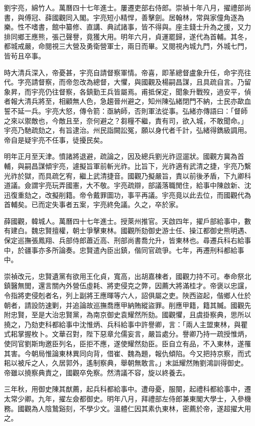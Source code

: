 \begin{pinyinscope}
劉宇亮，綿竹人。萬曆四十七年進士。屢遷吏部右侍郎。崇禎十年八月，擢禮部尚書，與傅冠、薛國觀同入閣。宇亮短小精悍，善擊劍。居翰林，常與家僮角逐為樂。性不嗜書，館中纂修、直講、典試諸事，皆不得與。座主錢士升為之援，又力排同鄉王應熊，張己聲譽，竟獲大用。明年六月，貞運罷歸，遂代為首輔。其冬，都城戒嚴，命閱視三大營及勇衛營軍士，兩日而畢。又閱視內城九門，外城七門，皆茍且卒事。

時大清兵深入，帝憂甚，宇亮自請督察軍情。帝喜，即革總督盧象升任，命宇亮往代。字亮請督察，而帝忽改為總督，大懼，與國觀及楊嗣昌謀，且具疏自言。乃留象昇，而宇亮仍往督察，各鎮勤王兵皆屬焉。甫抵保定，聞象升戰歿，過安平，偵者報大清兵將至，相顧無人色，急趨晉州避之，知州陳弘緒閉門不納，士民亦歃血誓不延一兵。宇亮大怒，傳令箭：亟納師，否則軍法從事。弘緒亦傳語曰：「督師之來以禦敵也，今敵且至，奈何避之？芻糧不繼，責有司，欲入城，不敢聞命。」宇亮乃馳疏劾之，有旨逮治。州民詣闕訟冤，願以身代者千計，弘緒得鐫級調用。帝自是疑宇亮不任事，徒擾民矣。

明年正月至天津。憤諸將退避，疏論之，因及總兵劉光祚逗遛狀。國觀方冀為首輔，與嗣昌謀傾宇亮，遽擬旨軍前斬光祚。比旨下，光祚適有武清之捷，宇亮乃繫光祚於獄，而具疏乞宥，繼上武清捷音。國觀乃擬嚴旨，責以前後矛盾，下九卿科道議。僉謂宇亮玩弄國憲，大不敬。宇亮疏辯，部議落職閒住，給事中陳啟新、沈迅復重劾之，改擬削籍。帝令戴罪圖功，事平再議。宇亮竟以此去位，而國觀代為首輔矣。已而定失事者五案，宇亮終免議。久之，卒於家。

薛國觀，韓城人。萬曆四十七年進士。授萊州推官。天啟四年，擢戶部給事中，數有建白。魏忠賢擅權，朝士爭擊東林。國觀所劾御史游士任、操江都御史熊明遇、保定巡撫張鳳翔、兵部侍郎蕭近高、刑部尚書喬允升，皆東林也。尋遷兵科右給事中，於疆事亦多所論奏。忠賢遣內臣出鎮，偕同官疏爭。七年，再遷刑科都給事中。

崇禎改元，忠賢遺黨有欲用王化貞，寬高，出胡嘉棟者，國觀力持不可。奉命祭北鎮醫無閭，還言關內外營伍虛耗、將吏侵克之弊，因薦大將滿桂才。帝褒以忠讜，令指將吏侵剋者名，列上副將王應暉等六人，詔俱屬之吏。陜西盜起，偕鄉人仕於朝者，請設防速剿，并追論故巡撫喬應甲納賄縱盜罪。削應甲籍，籍其贓。國觀先附忠賢，至是大治忠賢黨，為南京御史袁耀然所劾。國觀懼，且虞掛察典，思所以撓之，乃劾吏科都給事中沈惟炳、兵科給事中許譽卿，言：「兩人主盟東林，與瞿式耜掌握枚卜。文華召對，陛下惡章允儒妄言，嚴旨處分。譽卿乃持一疏授惟炳，使同官劉斯珣邀臣列名，臣拒不應，遂使耀然劾臣。臣自立有品，不入東林，遂罹其害。今朝局惟論東林異同向背，借崔、魏為題，報仇傾陷。今又把持京察，而式耜以被斥之人，久居郭外，遙制察典，舉朝無敢言。」末詆耀然賄劉鴻訓得御史。帝雖以撓察典責之，國觀卒免察。然清議不容，旋以終養去。

三年秋，用御史陳其猷薦，起兵科都給事中。遭母憂，服闋，起禮科都給事中，遷太常少卿。九年，擢左僉都御史。明年八月，拜禮部左侍郎兼東閣大學士，入參機務。國觀為人陰鷙谿刻，不學少文。溫體仁因其素仇東林，密薦於帝，遂超擢大用之。


\end{pinyinscope}
